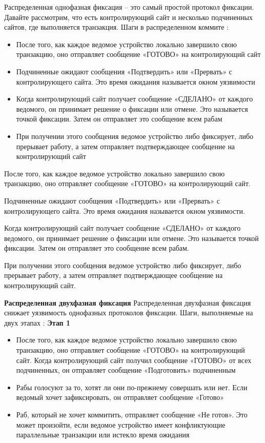 Распределенная однофазная фиксация – это самый простой протокол фиксации. Давайте рассмотрим, что есть
контролирующий сайт и несколько подчиненных сайтов, где выполняется транзакция. Шаги в распределенном коммите \autocite{FixProtocols}:
\begin{itemize}
    \item После того, как каждое ведомое устройство локально завершило свою транзакцию, оно
    отправляет сообщение «ГОТОВО» на контролирующий сайт
    \item Подчиненные ожидают сообщения «Подтвердить» или «Прервать» с контролирующего сайта.
    Это время ожидания называется окном уязвимости
    \item Когда контролирующий сайт получает сообщение «СДЕЛАНО» от каждого ведомого, он принимает решение
    о фиксации или отмене. Это называется точкой фиксации. Затем он отправляет это сообщение всем рабам
    \item При получении этого сообщения ведомое устройство либо фиксирует, либо прерывает работу,
    а затем отправляет подтверждающее сообщение на контролирующий сайт
\end{itemize}

После того, как каждое ведомое устройство локально завершило свою транзакцию, оно отправляет сообщение
«ГОТОВО» на контролирующий сайт.

Подчиненные ожидают сообщения «Подтвердить» или «Прервать» с контролирующего сайта. Это время ожидания
называется окном уязвимости.

Когда контролирующий сайт получает сообщение «СДЕЛАНО» от каждого ведомого, он принимает решение о
фиксации или отмене. Это называется точкой фиксации. Затем он отправляет это сообщение всем рабам.

При получении этого сообщения ведомое устройство либо фиксирует, либо прерывает работу,
а затем отправляет подтверждающее сообщение на контролирующий сайт.

\bigbreak
\textbf{Распределенная двухфазная фиксация}
Распределенная двухфазная фиксация снижает уязвимость однофазных протоколов фиксации. Шаги, выполняемые на двух этапах \autocite{FixProtocols}:
\bigbreak
\textbf{Этап 1}
\begin{itemize}
    \item После того, как каждое ведомое устройство локально завершило свою транзакцию,
    оно отправляет сообщение «ГОТОВО» на контролирующий сайт. Когда контролирующий сайт получил сообщение «ГОТОВО»
    от всех подчиненных, он отправляет сообщение «Подготовить» подчиненным
    \item Рабы голосуют за то, хотят ли они по-прежнему совершать или нет. Если ведомый
    хочет зафиксировать, он отправляет сообщение «Готово»
    \item Раб, который не хочет коммитить, отправляет сообщение «Не готов». Это может произойти,
    если ведомое устройство имеет конфликтующие параллельные транзакции или истекло время ожидания
\end{itemize}

